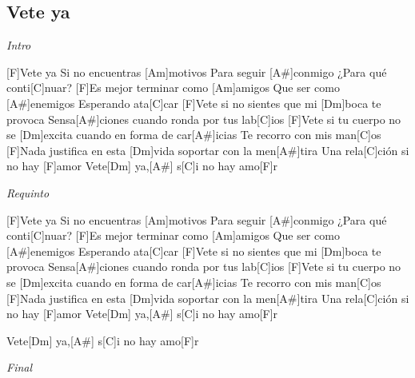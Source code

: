 \subsection{Vete ya}

\noindent
\vspace{1cm}

\begin{guitar}
	\begin{multicols}{2}
		\par
		\textit{Intro}

		[F]Vete ya
		Si no encuentras [Am]motivos
		Para seguir [A#]conmigo
		¿Para qué conti[C]nuar?
		[F]Es mejor terminar como [Am]amigos
		Que ser como [A#]enemigos
		Esperando ata[C]car
		[F]Vete si no sientes que mi [Dm]boca te provoca
		Sensa[A#]ciones cuando ronda por tus lab[C]ios
		[F]Vete si tu cuerpo no se [Dm]excita cuando en forma de car[A#]icias
		Te recorro con mis man[C]os
		[F]Nada justifica en esta [Dm]vida soportar con la men[A#]tira
		Una rela[C]ción si no hay [F]amor
		Vete[Dm] ya,[A#] s[C]i no hay amo[F]r

		\textit{Requinto}

		[F]Vete ya
		Si no encuentras [Am]motivos
		Para seguir [A#]conmigo
		¿Para qué conti[C]nuar?
		[F]Es mejor terminar como [Am]amigos
		Que ser como [A#]enemigos
		Esperando ata[C]car
		[F]Vete si no sientes que mi [Dm]boca te provoca
		Sensa[A#]ciones cuando ronda por tus lab[C]ios
		[F]Vete si tu cuerpo no se [Dm]excita cuando en forma de car[A#]icias
		Te recorro con mis man[C]os
		[F]Nada justifica en esta [Dm]vida soportar con la men[A#]tira
		Una rela[C]ción si no hay [F]amor
		Vete[Dm] ya,[A#] s[C]i no hay amo[F]r
		\par
		Vete[Dm] ya,[A#] s[C]i no hay amo[F]r


		\textit{Final}
		
\end{multicols}
\end{guitar}
